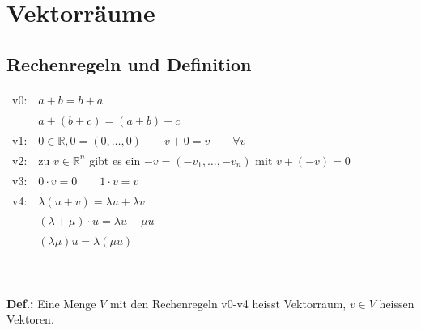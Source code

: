 \newpage
\section{Vektorräume}

\subsection{Rechenregeln und Definition}
	\begin{tabular}{| l | l |}
		\hline v0: & $a + b = b + a$\\
			& $a + (b + c) = (a + b) + c$\\
		\hline v1: & $0 \in \mathbb{R}, 0 = (0, \ldots, 0) \qquad v + 0 = v \qquad \forall v$\\
		\hline v2: & zu $v \in \mathbb{R}^n$ gibt es ein $-v = (-v_1, \ldots, -v_n)$ \qquad mit $v + (-v) = 0$\\
		\hline v3: & $0 \cdot v = 0 \qquad 1 \cdot v = v$\\
		\hline v4: & $\lambda(u + v) = \lambda u + \lambda v$\\
			& $(\lambda + \mu) \cdot u = \lambda u + \mu u$\\
			& $(\lambda\mu)u = \lambda(\mu u)$\\
		\hline
	\end{tabular}\\ \\

	\textbf{Def.:} Eine Menge $V$ mit den Rechenregeln v0-v4 heisst Vektorraum, $v \in V$ heissen Vektoren.

